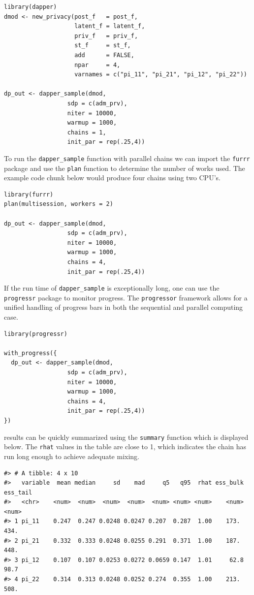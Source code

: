 \begin{verbatim}
library(dapper)
dmod <- new_privacy(post_f   = post_f,
                    latent_f = latent_f,
                    priv_f   = priv_f,
                    st_f     = st_f,
                    add      = FALSE,
                    npar     = 4,
                    varnames = c("pi_11", "pi_21", "pi_12", "pi_22"))
                  
dp_out <- dapper_sample(dmod,
                  sdp = c(adm_prv),
                  niter = 10000,
                  warmup = 1000,
                  chains = 1,
                  init_par = rep(.25,4))
\end{verbatim}

To run the \texttt{dapper\_sample} function with parallel chains
we can import the \texttt{furrr} package and use the \texttt{plan} function
to determine the number of works used. The example code chunk below
would produce four chains using two CPU's.

\begin{verbatim}
library(furrr)
plan(multisession, workers = 2)

dp_out <- dapper_sample(dmod,
                  sdp = c(adm_prv),
                  niter = 10000,
                  warmup = 1000,
                  chains = 4,
                  init_par = rep(.25,4))
\end{verbatim}

If the run time of \texttt{dapper\_sample} is exceptionally long, one can
use the \texttt{progressr} package to monitor progress. The \texttt{progressor} framework
allows for a unified handling of progress bars in both the sequential and
parallel computing case.

\begin{verbatim}
library(progressr)

with_progress({
  dp_out <- dapper_sample(dmod,
                  sdp = c(adm_prv),
                  niter = 10000,
                  warmup = 1000,
                  chains = 4,
                  init_par = rep(.25,4))
})
\end{verbatim}

results can be quickly summarized using the \texttt{summary} function which is
displayed below. The \texttt{rhat} values in the table are close to 1, which indicates
the chain has run long enough to achieve adequate mixing.

\begin{verbatim}
#> # A tibble: 4 x 10
#>   variable  mean median     sd    mad     q5   q95  rhat ess_bulk ess_tail
#>   <chr>    <num>  <num>  <num>  <num>  <num> <num> <num>    <num>    <num>
#> 1 pi_11    0.247  0.247 0.0248 0.0247 0.207  0.287  1.00    173.     434. 
#> 2 pi_21    0.332  0.333 0.0248 0.0255 0.291  0.371  1.00    187.     448. 
#> 3 pi_12    0.107  0.107 0.0253 0.0272 0.0659 0.147  1.01     62.8     98.7
#> 4 pi_22    0.314  0.313 0.0248 0.0252 0.274  0.355  1.00    213.     508.
\end{verbatim}

